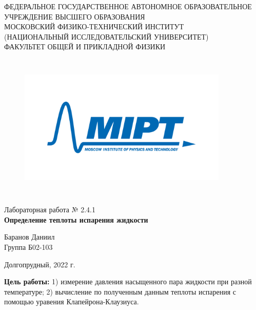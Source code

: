 \documentclass[a4paper,12pt]{article} %
\begin{document}
\begin{center}
	\footnotesize{ФЕДЕРАЛЬНОЕ ГОСУДАРСТВЕННОЕ АВТОНОМНОЕ ОБРАЗОВАТЕЛЬНОЕ 			УЧРЕЖДЕНИЕ ВЫСШЕГО ОБРАЗОВАНИЯ}\\
	\footnotesize{МОСКОВСКИЙ ФИЗИКО-ТЕХНИЧЕСКИЙ ИНСТИТУТ\\(НАЦИОНАЛЬНЫЙ 			ИССЛЕДОВАТЕЛЬСКИЙ УНИВЕРСИТЕТ)}\\
	\footnotesize{ФАКУЛЬТЕТ ОБЩЕЙ И ПРИКЛАДНОЙ ФИЗИКИ\\}
	\hfill \break
	\hfill \break
	\hfill \break
	\hfill \break
\end{center}


\begin{figure}[h]
    \centering
    \includegraphics*[width=10cm,height=7cm,keepaspectratio]{mipt_eng_text_png.png}
    \label{fig:my_label}
\end{figure}


\begin{center}   
    \hfill \break
	\hfill \break
	\hfill \break
	\hfill \break
	\large{Лабораторная работа № 2.4.1\\\textbf{Определение теплоты испарения жидкости}}\\
	\hfill \break
	\hfill \break
	\hfill \break
	\hfill \break
	\begin{flushright}
		Баранов Даниил\\
		Группа Б02-103
	\end{flushright}
	\hfill \break
	\hfill \break
	\hfill \break
\end{center}
\hfill \break
\hfill \break
\hfill \break
\hfill \break
\begin{center}
	Долгопрудный, 2022 г.
\end{center}
\thispagestyle{empty}
\newpage
	\textbf{Цель работы:} 1) измерение давления насыщенного пара жидкости при разной температуре; 2) вычисление по полученным данным теплоты испарения с помощью уравения Клапейрона-Клаузиуса.
	\hfill \break
	
\end{document}

